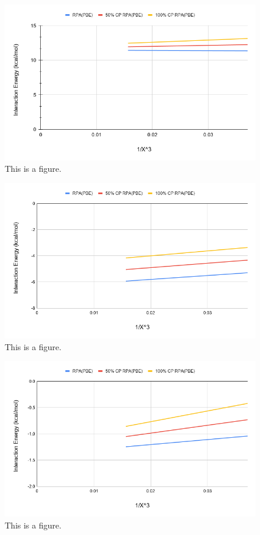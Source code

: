 \documentclass[11pt]{article}
\begin{document}
\begin{figure}
  \includegraphics[scale=0.5]{tpssh_11.png}
  \caption{This is a figure.}
  \label{fig:<name>}
\end{figure}

\begin{figure}
  \includegraphics[scale=0.5]{tpssh_24.png}
  \caption{This is a figure.}
  \label{fig:<name>}
\end{figure}

\begin{figure}
  \includegraphics[scale=0.5]{tpssh_27.png}
  \caption{This is a figure.}
  \label{fig:<name>}
\end{figure}
\end{document}
